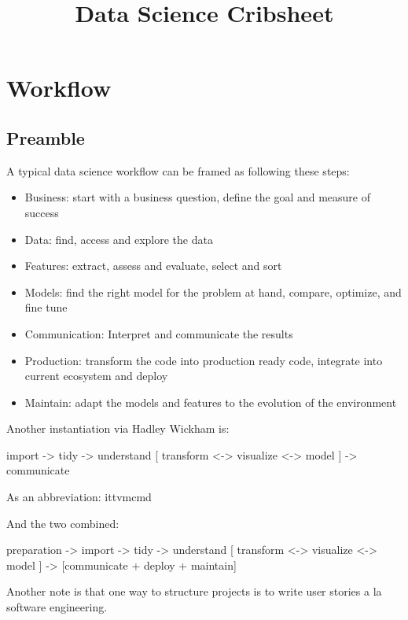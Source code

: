 \documentclass[]{book}
\title{Data Science Cribsheet}
\author{}
\date{}
\begin{document}
\maketitle

{
\setcounter{tocdepth}{1}
\tableofcontents
}
\hypertarget{workflow}{%
\chapter{Workflow}\label{workflow}}

\hypertarget{preamble}{%
\section{Preamble}\label{preamble}}

A typical data science workflow can be framed as following these steps:

\begin{itemize}
\item
  Business: start with a business question, define the goal and measure of success
\item
  Data: find, access and explore the data
\item
  Features: extract, assess and evaluate, select and sort
\item
  Models: find the right model for the problem at hand, compare, optimize, and fine tune
\item
  Communication: Interpret and communicate the results
\item
  Production: transform the code into production ready code, integrate into current ecosystem and deploy
\item
  Maintain: adapt the models and features to the evolution of the environment
\end{itemize}

Another instantiation via Hadley Wickham is:

import -\textgreater{} tidy -\textgreater{} understand {[} transform \textless{}-\textgreater{} visualize \textless{}-\textgreater{} model {]} -\textgreater{} communicate

As an abbreviation: ittvmcmd

And the two combined:

preparation -\textgreater{} import -\textgreater{} tidy -\textgreater{} understand {[} transform \textless{}-\textgreater{} visualize \textless{}-\textgreater{} model {]} -\textgreater{} {[}communicate + deploy + maintain{]}

Another note is that one way to structure projects is to write user stories a la software engineering.
\end{document}
